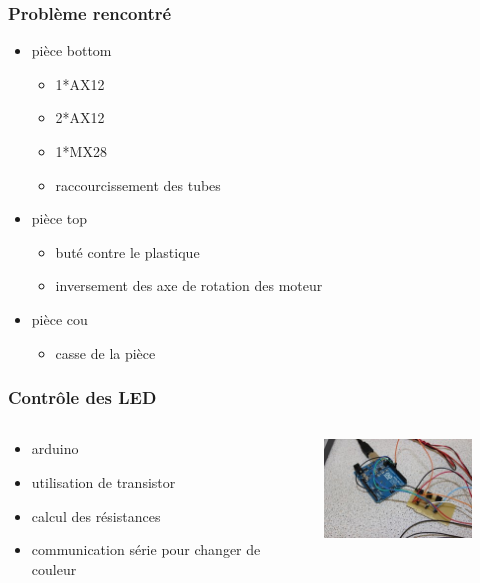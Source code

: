 \begin{frame}
  \frametitle{Problème rencontré}
  \begin{itemize}
    \item pièce bottom 
      \begin{itemize}
        \item 1*AX12
        \item 2*AX12 
        \item 1*MX28
        \item raccourcissement des tubes
      \end{itemize}
    \item pièce top
      \begin{itemize}
        \item buté contre le plastique
        \item inversement des axe de rotation des moteur
      \end{itemize}
    \item pièce cou
      \begin{itemize}
        \item casse de la pièce
      \end{itemize}
  \end{itemize}
\end{frame}

\begin{frame}
  \frametitle{Contrôle des LED}
  \begin{columns}[c]
    \begin{column}[T]{0.5\textwidth}
      \begin{itemize}
        \item arduino
        \item utilisation de transistor
        \item calcul des résistances
        \item communication série pour changer de couleur
      \end{itemize}
    \end{column}
    \begin{column}[T]{0.5\textwidth}
      \begin{figure}
        \includegraphics[width=5cm]{../img/arduino+transistorcard.JPG}
      \end{figure}
    \end{column}
  \end{columns}
\end{frame}
